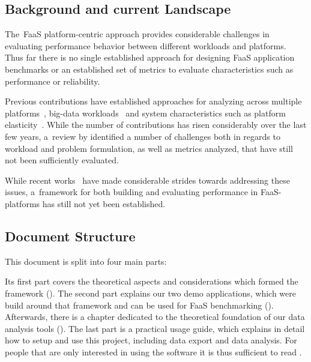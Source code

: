 \documentclass[../main.tex]{subfiles}
\begin{document}
\subsection{Background and current Landscape}\label{sec:background}

The~FaaS platform-centric approach provides considerable challenges in evaluating performance behavior between different workloads and platforms. 
Thus far there is no single established approach for designing FaaS application benchmarks or an established set of metrics 
to evaluate characteristics such as performance or reliability.

Previous contributions have established approaches for analyzing across multiple platforms~\cite{malawski_benchmarking_2018}, 
big-data workloads~\cite{kuhlenkamp_evaluation_2019} and system characteristics such as platform elasticity~\cite{kuhlenkamp_benchmarking_2020}. 
While the number of contributions has risen considerably over the last few years, 
a~review by \textcite{kuhlenkamp_benchmarking_2018} identified a number of challenges both in regards to workload and problem formulation, 
as well as metrics analyzed, that have still not been sufficiently evaluated.

While recent works~\cites{kuhlenkamp_benchmarking_2020,van_eyk_beyond_2020} have made considerable strides towards addressing these issues, 
a~framework for both building and evaluating performance in FaaS-platforms has still not yet been established.

\subsection{Document Structure}%
\label{sub:introDocStructure}

This document is split into four main parts: 

Its first part covers the theoretical aspects and considerations which formed the framework ().
The second part explains our two demo applications, which were build around that framework and can be used for FaaS benchmarking
().
Afterwards, there is a chapter dedicated to the theoretical foundation of our data analysis tools ().
The last part is a practical usage guide, which explains in detail how to setup and use this project,
including data export and data analysis.
For people that are only interested in using the software it is thus sufficient to read .
\end{document}

